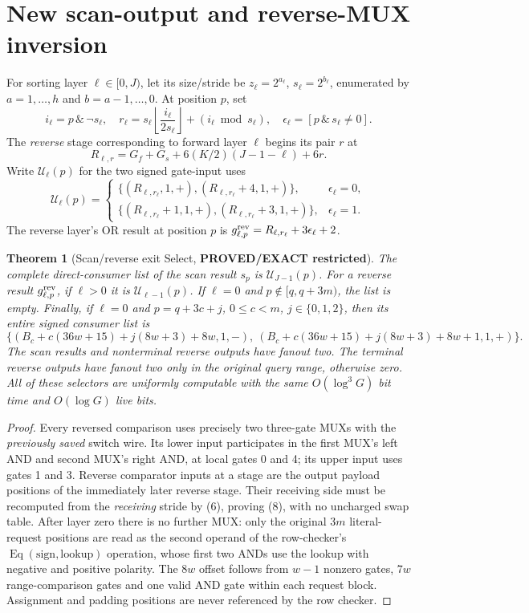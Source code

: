 \documentclass[11pt]{article}
\newtheorem{theorem}{Theorem}
\begin{document}
\section{New scan-output and reverse-MUX inversion}
For sorting layer $\ell\in[0,J)$, let its size/stride be
$z_\ell=2^{a_\ell}$, $s_\ell=2^{b_\ell}$, enumerated by
$a=1,\ldots,h$ and $b=a-1,\ldots,0$. At position $p$,
set
\[
 i_\ell=p\,\&\,\neg s_\ell,\quad
 r_\ell=s_\ell\left\lfloor\frac{i_\ell}{2s_\ell}\right\rfloor
       +(i_\ell\bmod s_\ell),\quad
 \epsilon_\ell=[p\,\&\,s_\ell\ne0].                      \tag{6}
\]
The \emph{reverse} stage corresponding to forward layer
$\ell$ begins its pair $r$ at
\[
 R_{\ell,r}=G_f+G_s+6(K/2)(J-1-\ell)+6r.                \tag{7}
\]
Write $\mathcal U_\ell(p)$ for the two signed gate-input
uses
\[
 \mathcal U_\ell(p)=
 \begin{cases}
 \{(R_{\ell,r_\ell},1,+),(R_{\ell,r_\ell}+4,1,+)\},
               &\epsilon_\ell=0,\\
 \{(R_{\ell,r_\ell}+1,1,+),(R_{\ell,r_\ell}+3,1,+)\},
               &\epsilon_\ell=1.
 \end{cases}                                                 \tag{8}
\]
The reverse layer's OR result at position $p$ is
$g^{\rm rev}_{\ell,p}=R_{\ell,r_\ell}+3\epsilon_\ell+2$.
\begin{theorem}[Scan/reverse exit Select, \textbf{PROVED/EXACT restricted}]
The complete direct-consumer list of the scan result
$s_p$ is $\mathcal U_{J-1}(p)$. For a reverse result
$g^{\rm rev}_{\ell,p}$, if $\ell>0$ it is
$\mathcal U_{\ell-1}(p)$. If $\ell=0$ and
$p\notin[q,q+3m)$, the list is empty. Finally, if
$\ell=0$ and $p=q+3c+j$, $0\le c<m$, $j\in\{0,1,2\}$,
then its entire signed consumer list is
\[
\{(B_c+c(36w+15)+j(8w+3)+8w,1,-),
\ (B_c+c(36w+15)+j(8w+3)+8w+1,1,+)\}.               \tag{9}
\]
The scan results and nonterminal reverse outputs have
fanout two. The terminal reverse outputs have fanout two
\emph{only} in the original query range, otherwise zero.
All of these selectors are uniformly computable with the same
$O(\log^3G)$ bit time and $O(\log G)$ live bits.
\end{theorem}
\begin{proof}
Every reversed comparison uses precisely two three-gate
MUXs with the \emph{previously saved} switch wire. Its lower
input participates in the first MUX's left AND and second
MUX's right AND, at local gates 0 and 4; its upper input
uses gates 1 and 3. Reverse comparator inputs at a stage
are the output payload positions of the immediately later
reverse stage. Their receiving side must be recomputed from
the \emph{receiving} stride by (6), proving (8), with no
uncharged swap table. After layer zero there is no further
MUX: only the original $3m$ literal-request positions are
read as the second operand of the row-checker's
$\operatorname{Eq}(\text{sign},\text{lookup})$ operation,
whose first two ANDs use the lookup with negative and
positive polarity. The $8w$ offset follows from $w-1$
nonzero gates, $7w$ range-comparison gates and one valid
AND gate within each request block. Assignment and padding
positions are never referenced by the row checker.
\end{proof}
\end{document}
